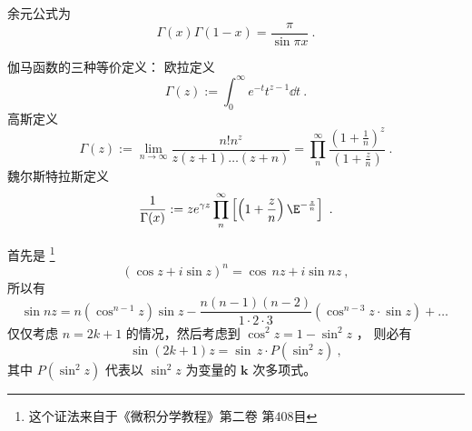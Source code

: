 
\begin{issues}
\end{issues}


余元公式为
\begin{equation}
\Gamma(x)\Gamma(1-x)=\frac{\pi}{\sin  \pi x}~.
\end{equation}

\begin{lemma}{伽马函数的三种等价定义：}
欧拉定义
\begin{equation}
\Gamma(z):=\int^{\infty}_{0}e^{-t}t^{z-1} \dd{t}~.
\end{equation}
高斯定义
\begin{equation}
\Gamma(z):=\lim_{n \rightarrow \infty}{\frac{n!n^z}{z(z+1)\dots (z+n)}}=\prod_{n}^{\infty}\frac{\left( 1+\frac1n \right)^z}{\left( 1+\frac zn \right)}~.
\end{equation}
魏尔斯特拉斯定义
\begin{equation}
\frac1{\Gamma(x)}:=ze^{\gamma z}\prod_{n}^{\infty}\left[ \left( 1+\frac{z}{n}\right)\E^{-\frac{z}{n}}  \right]~.
\end{equation}
\end{lemma}
首先是 \footnote{这个证法来自于《微积分学教程》第二卷 第408目}
\begin{equation}
(\cos z+i\sin z)^n=\cos\,nz+i\sin nz~,
\end{equation}
所以有
\begin{equation}
\sin nz=n(\cos^{n-1}z)\sin z-\frac{n(n-1)(n-2)}{1\cdot 2\cdot 3}(\cos^{n-3}z \cdot \sin z)+\dots~
\end{equation}
仅仅考虑 $n=2k+1$ 的情况，然后考虑到 $\cos^2 z=1-\sin^2z$ ， 则必有
\begin{equation}
\sin(2k+1)z=\sin\,z\cdot P(\sin^2z)~,
\end{equation}
其中 $P(\sin^2z)$ 代表以 $ \sin^2z$ 为变量的 $\mathbf{k}$ 次多项式。

